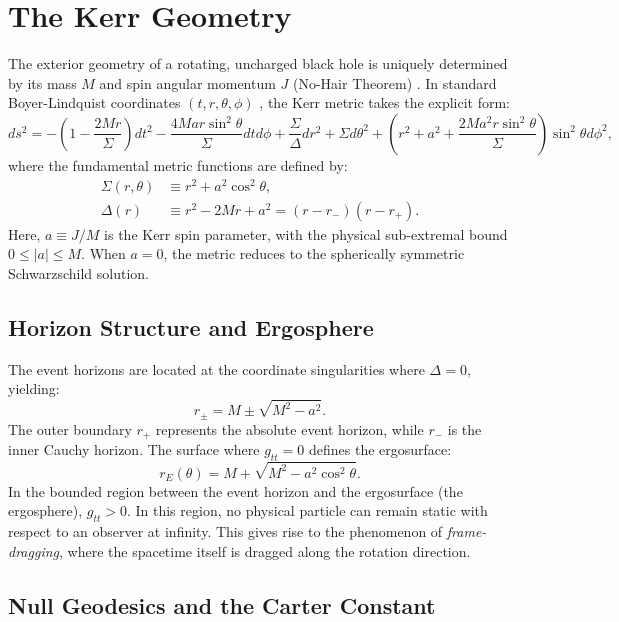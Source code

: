 \documentclass[11pt]{book}
\begin{document}
\section{The Kerr Geometry}

The exterior geometry of a rotating, uncharged black hole is uniquely determined by its mass \(M\) and spin angular momentum \(J\) (No-Hair Theorem) \cite{Chandrasekhar1983}. In standard Boyer-Lindquist coordinates $(t, r, \theta, \phi)$ \cite{Kerr1963, Boyer1967}, the Kerr metric takes the explicit form:
\begin{equation}
    ds^2 = -\left(1 - \frac{2Mr}{\Sigma}\right) dt^2 - \frac{4Mar\sin^2\theta}{\Sigma} dt d\phi + \frac{\Sigma}{\Delta} dr^2 + \Sigma d\theta^2 + \left(r^2 + a^2 + \frac{2Ma^2r\sin^2\theta}{\Sigma}\right)\sin^2\theta d\phi^2,
\end{equation}
where the fundamental metric functions are defined by:
\begin{align}
    \Sigma(r, \theta) &\equiv r^2 + a^2 \cos^2\theta, \\
    \Delta(r) &\equiv r^2 - 2Mr + a^2 = (r - r_-)(r - r_+).
\end{align}
Here, $a \equiv J/M$ is the Kerr spin parameter, with the physical sub-extremal bound $0 \leq |a| \leq M$. When $a = 0$, the metric reduces to the spherically symmetric Schwarzschild solution.

\subsection{Horizon Structure and Ergosphere}
The event horizons are located at the coordinate singularities where $\Delta = 0$, yielding:
\begin{equation}
    r_\pm = M \pm \sqrt{M^2 - a^2}.
\end{equation}
The outer boundary $r_+$ represents the absolute event horizon, while $r_-$ is the inner Cauchy horizon. The surface where $g_{tt} = 0$ defines the ergosurface:
\begin{equation}
    r_E(\theta) = M + \sqrt{M^2 - a^2\cos^2\theta}.
\end{equation}
In the bounded region between the event horizon and the ergosurface (the ergosphere), $g_{tt} > 0$. In this region, no physical particle can remain static with respect to an observer at infinity. This gives rise to the phenomenon of \textit{frame-dragging}, where the spacetime itself is dragged along the rotation direction.

\subsection{Null Geodesics and the Carter Constant}
\end{document}
